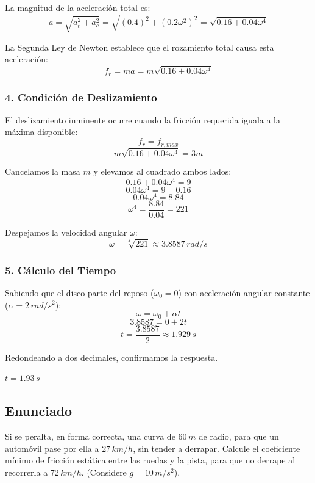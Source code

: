 \documentclass[12pt, a4paper]{article}
\begin{document}
La magnitud de la aceleración total es:
$$ a = \sqrt{a_t^2 + a_c^2} = \sqrt{(0.4)^2 + (0.2\omega^2)^2} = \sqrt{0.16 + 0.04\omega^4} $$

La Segunda Ley de Newton establece que el rozamiento total causa esta aceleración:
$$ f_r = m a = m \sqrt{0.16 + 0.04\omega^4} $$

\subsubsection*{4. Condición de Deslizamiento}
El deslizamiento inminente ocurre cuando la fricción requerida iguala a la máxima disponible:
$$ f_r = f_{r,max} $$
$$ m \sqrt{0.16 + 0.04\omega^4} = 3m $$

Cancelamos la masa $m$ y elevamos al cuadrado ambos lados:
$$ 0.16 + 0.04\omega^4 = 9 $$
$$ 0.04\omega^4 = 9 - 0.16 $$
$$ 0.04\omega^4 = 8.84 $$
$$ \omega^4 = \frac{8.84}{0.04} = 221 $$

Despejamos la velocidad angular $\omega$:
$$ \omega = \sqrt[4]{221} \approx 3.8587 \, \si{rad/s} $$

\subsubsection*{5. Cálculo del Tiempo}
Sabiendo que el disco parte del reposo ($\omega_0 = 0$) con aceleración angular constante ($\alpha = 2 \, \si{rad/s^2}$):
$$ \omega = \omega_0 + \alpha t $$
$$ 3.8587 = 0 + 2t $$
$$ t = \frac{3.8587}{2} \approx 1.929 \, \si{s} $$

Redondeando a dos decimales, confirmamos la respuesta.

\begin{tcolorbox}[colback=green!5!white, colframe=green!50!black, title=Respuesta Final]
\centering \Large $t = 1.93 \, \si{s}$
\end{tcolorbox}

\newpage

\subsection*{Enunciado}
Si se peralta, en forma correcta, una curva de $60 \, \si{m}$ de radio, para que un automóvil pase por ella a $27 \, \si{km/h}$, sin tender a derrapar. Calcule el coeficiente mínimo de fricción estática entre las ruedas y la pista, para que no derrape al recorrerla a $72 \, \si{km/h}$. (Considere $g = 10 \, \si{m/s^2}$).
\end{document}
